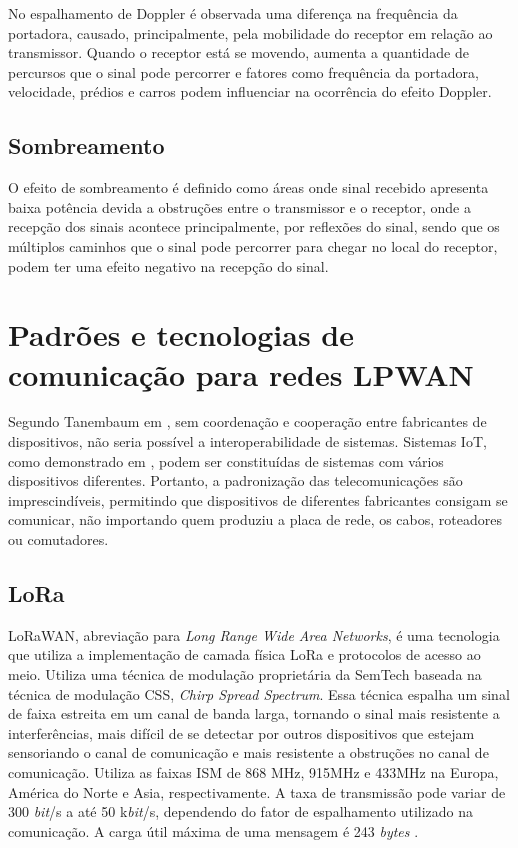 No espalhamento de Doppler é observada uma diferença na frequência da portadora, causado, principalmente, pela mobilidade do receptor em relação ao transmissor. Quando o receptor está se movendo, aumenta a quantidade de percursos que o sinal pode percorrer e fatores como frequência da portadora, velocidade, prédios e carros podem influenciar na ocorrência do efeito Doppler.


\subsection{Sombreamento}
O efeito de sombreamento é definido como áreas onde sinal recebido apresenta baixa potência devida a obstruções entre o transmissor e o receptor, onde a recepção dos sinais acontece principalmente, por reflexões do sinal, sendo que os múltiplos caminhos que o sinal pode percorrer para chegar no local do receptor, podem ter uma efeito negativo na recepção do sinal.


\section{Padrões e tecnologias de comunicação para redes LPWAN}
\label{padrõesSF}
Segundo Tanembaum em \cite{tanembaum2011}, sem coordenação e cooperação entre fabricantes de dispositivos, não seria possível a interoperabilidade de sistemas. Sistemas IoT, como demonstrado em \cite{sotres2017practical}, podem ser constituídas de sistemas com vários dispositivos diferentes. Portanto, a padronização das telecomunicações são imprescindíveis, permitindo que dispositivos de diferentes fabricantes consigam se comunicar, não importando quem produziu a placa de rede, os cabos, roteadores ou comutadores.

\subsection{LoRa}
LoRaWAN, abreviação para \emph{Long Range Wide Area Networks}, é uma tecnologia que utiliza a implementação de camada física LoRa e protocolos de acesso ao meio. Utiliza uma técnica de modulação proprietária da SemTech baseada na técnica de modulação CSS, \emph{Chirp Spread Spectrum}. Essa técnica espalha um sinal de faixa estreita em um canal de banda larga, tornando o sinal mais resistente a interferências, mais difícil de se detectar por outros dispositivos que estejam sensoriando o canal de comunicação e mais resistente a obstruções no canal de comunicação. Utiliza as faixas ISM de 868 MHz, 915MHz e 433MHz na Europa, América do Norte e Asia, respectivamente. A taxa de transmissão pode variar de 300 \emph{bit}/s a até 50 k\emph{bit}/s, dependendo do fator de espalhamento utilizado na comunicação. A carga útil máxima de uma mensagem é 243 \emph{bytes} \cite{mekki2019comparative}.

